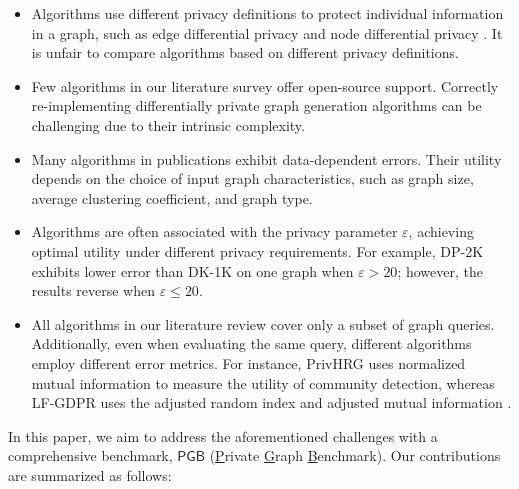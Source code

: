 \documentclass[conference]{IEEEtran}
\theoremstyle{plain}
\begin{document}
\begin{itemize}
    \item 
    Algorithms use different privacy definitions to protect individual information in a graph, such as edge differential privacy \cite{wang2013preserving,nguyen2015differentially,chen2014correlated,mir2012differentially,xiao2014differentially,yuan2023privgraph,chen2019publishing,jorgensen2016publishing} and node differential privacy \cite{zhang2020community,jian2021publishing}.
    It is unfair to compare algorithms based on different privacy definitions.

    \item 
    Few algorithms in our literature survey offer open-source support. 
    Correctly re-implementing differentially private graph generation algorithms can be challenging due to their intrinsic complexity.

    \item 
    Many algorithms in publications exhibit data-dependent errors. 
    Their utility depends on the choice of input graph characteristics, such as graph size, average clustering coefficient, and graph type.
    
    \item 
    Algorithms are often associated with the privacy parameter $\varepsilon$, achieving optimal utility under different privacy requirements. 
    For example, DP-2K \cite{wang2013preserving} exhibits lower error than DK-1K \cite{wang2013preserving} on one graph when $\varepsilon > 20$; however, the results reverse when $\varepsilon \leq 20$.

    \item 
    All algorithms in our literature review cover only a subset of graph queries. 
    Additionally, even when evaluating the same query, different algorithms employ different error metrics. 
    For instance, PrivHRG \cite{xiao2014differentially} uses normalized mutual information \cite{kvalseth1987entropy} to measure the utility of community detection, whereas LF-GDPR \cite{ye2020lf} uses the adjusted random index \cite{rand1971objective} and adjusted mutual information \cite{vinh2009information}.
    
\end{itemize}

In this paper, we aim to address the aforementioned challenges with a comprehensive benchmark, $\mathsf{PGB}$ (\underline{P}rivate \underline{G}raph \underline{B}enchmark). 
Our contributions are summarized as follows:
\end{document}
